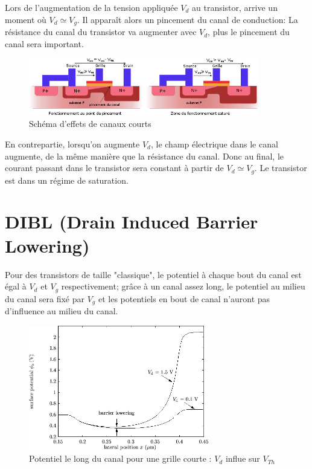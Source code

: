 \documentclass[a4paper,11pt]{report}
\begin{document}
Lors de l'augmentation de la tension appliquée $V_d$ au transistor, arrive un moment où $V_d \simeq V_g$. Il apparaît alors un pincement du canal de conduction: La résistance du canal du transistor va augmenter avec $V_d$, plus le pincement du canal sera important.

\begin{figure}[h]
    \begin{center}
        \includegraphics[width=0.9\textwidth]{Images/Canaux_Courts.png}
        \caption{Schéma d'effets de canaux courts}
        \label{fig:canaux}
    \end{center}
\end{figure}

En contrepartie, lorsqu'on augmente $V_d$, le champ électrique dans le canal augmente, de la même manière que la résistance du canal. Donc au final, le courant passant dans le transistor sera constant à partir de $V_d \simeq V_g$. Le transistor est dans un régime de saturation.

\section{DIBL (Drain Induced Barrier Lowering)}
Pour des transistors de taille "classique", le potentiel à chaque bout du canal est égal à $V_d$ et $V_g$ respectivement; grâce à un canal assez long, le potentiel au milieu du canal sera fixé par $V_g$ et les potentiels en bout de canal n'auront pas d'influence au milieu du canal.

\begin{figure}[h]
    \begin{center}
        \includegraphics[width=0.7\textwidth]{Images/DIBL_schema.png}
        \caption{Potentiel le long du canal pour une grille courte : $V_d$ influe sur $V_{Th}$}
        \label{fig:potcanaux}
    \end{center}
\end{figure}
\end{document}
